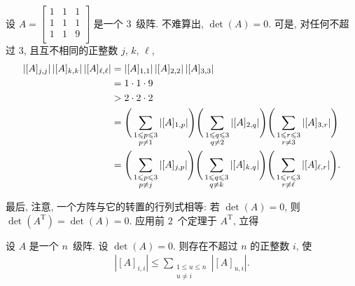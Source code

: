 \documentclass[../libro.tex]{subfiles}
\begin{document}
\begin{example}
    设 \(A =
        \begin{bmatrix}
            1 & 1 & 1 \\
            1 & 1 & 1 \\
            1 & 1 & 9 \\
    \end{bmatrix}\)
    是一个 \(3\)~级阵.
    不难算出, \(\det {(A)} = 0\).
    可是,
    对任何不超过 \(3\),
    且互不相同的正整数 \(j\), \(k\), \(\ell\),
    \begin{align*}
        |[A]_{j,j}|\,|[A]_{k,k}|\, |[A]_{\ell,\ell}|
        = {} &
        |[A]_{1,1}|\,|[A]_{2,2}|\, |[A]_{3,3}|
        \\
        = {} &
        1 \cdot 1 \cdot 9
        \\
        > {} &
        2 \cdot 2 \cdot 2
        \\
        = {} &
        \Bigg(
            \sum_{\substack{1 \leqslant p \leqslant 3 \\
            p \neq 1}} {|[A]_{1,p}|}
        \Bigg)
        \Bigg(
            \sum_{\substack{1 \leqslant q \leqslant 3 \\
            q \neq 2}} {|[A]_{2,q}|}
        \Bigg)
        \Bigg(
            \sum_{\substack{1 \leqslant r \leqslant 3 \\
            r \neq 3}} {|[A]_{3,r}|}
        \Bigg)
        \\
        = {} &
        \Bigg(
            \sum_{\substack{1 \leqslant p \leqslant 3 \\
            p \neq j}} {|[A]_{j,p}|}
        \Bigg)
        \Bigg(
            \sum_{\substack{1 \leqslant q \leqslant 3 \\
            q \neq k}} {|[A]_{k,q}|}
        \Bigg)
        \Bigg(
            \sum_{\substack{1 \leqslant r \leqslant 3 \\
            r \neq \ell}} {|[A]_{\ell,r}|}
        \Bigg).
        \qedhere
    \end{align*}
\end{example}

最后, 注意, 一个方阵与它的转置的行列式相等:
若 \(\det {(A)} = 0\),
则 \(\det {(A^{\mathrm{T}})} = \det {(A)} = 0\).
应用前 \(2\)~个定理于 \(A^{\mathrm{T}}\), 立得

\begin{theorem}
    设 \(A\) 是一个 \(n\)~级阵.
    设 \(\det {(A)} = 0\).
    则存在不超过 \(n\) 的正整数 \(i\), 使
    \begin{align*}
        |[A]_{i,i}| \leq
        \sum_{\substack{1 \leq u \leq n \\
        u \neq i}} {|[A]_{u,i}|}.
    \end{align*}
\end{theorem}
\end{document}
